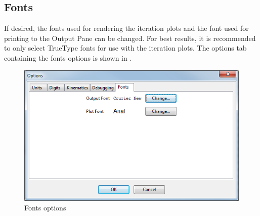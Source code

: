 \subsection{Fonts} \label{ssec:optionsFonts}

If desired, the fonts used for rendering the iteration plots and the font used for printing to the Output Pane can be changed.  For best results, it is recommended to only select TrueType fonts for use with the iteration plots.  The options tab containing the fonts options is shown in .

\begin{figure}
  \includegraphics[width=\textwidth]{images/optionsFonts}
  \caption{Fonts options} \label{fig:optionsFonts}
  \centering
\end{figure}
